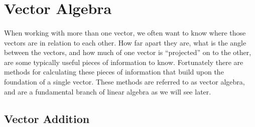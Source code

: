 \documentclass[12pt, letterpaper]{report}
\begin{document}
	\section{Vector Algebra}

	\paragraph{} When working with more than one vector, we often want to know where those vectors are in relation to each other. How far apart they are, what is the angle between the vectors, and how much of one vector is ``projected'' on to the other, are some typically useful pieces of information to know. Fortunately there are methods for calculating these pieces of information that build upon the foundation of a single vector. These methods are referred to as vector algebra, and are a fundamental branch of linear algebra as we will see later.
		\subsection{Vector Addition}
\end{document}
